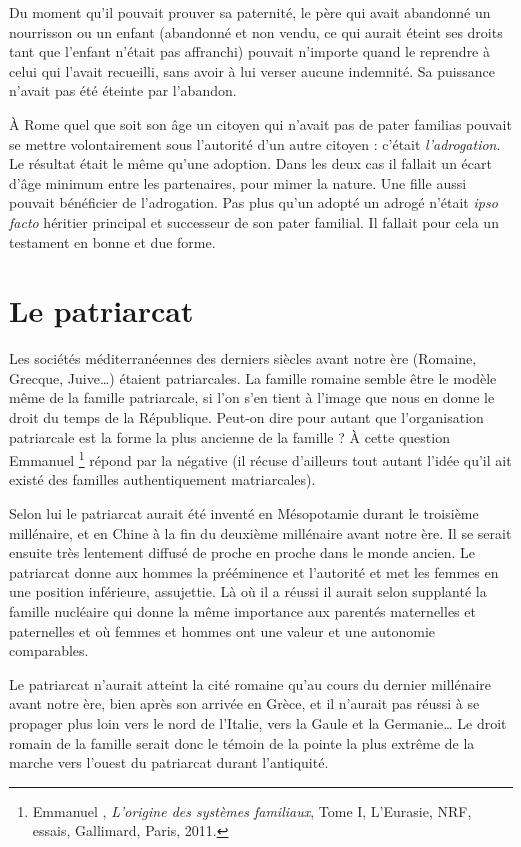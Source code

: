 Du moment qu'il pouvait prouver sa paternité, le père qui avait
abandonné un nourrisson ou un enfant (abandonné et non vendu, ce qui
aurait éteint ses droits tant que l'enfant n'était pas affranchi) pouvait
n'importe quand le reprendre à celui qui l'avait recueilli, sans avoir à lui
verser aucune indemnité. Sa puissance n'avait pas été éteinte par l'abandon.

À Rome quel que soit son âge un citoyen qui n'avait pas de pater
familias pouvait se mettre volontairement sous l'autorité d'un autre citoyen :
c'était \emph{l'adrogation}. Le résultat était le même qu'une adoption. Dans
les deux cas il fallait un écart d'âge minimum entre les partenaires, pour
mimer la nature. Une fille aussi pouvait bénéficier de l'adrogation. Pas
plus qu'un adopté un adrogé n'était \emph{ipso facto} héritier principal et successeur
de son pater familial. Il fallait pour cela un testament en bonne et
due forme.

\section{Le patriarcat}

Les sociétés méditerranéennes des derniers siècles avant notre ère
(Romaine, Grec\-que, Juive…) étaient patriarcales. La famille romaine
semble être le modèle même de la famille patriarcale, si l'on s'en tient à
l'image que nous en donne le droit du temps de la République. Peut-on
dire pour autant que l'organisation patriarcale est la forme la plus ancienne
de la famille ? À cette question Emmanuel %
\footnote{Emmanuel , \emph{L'origine des systèmes familiaux}, Tome I, L'Eurasie, NRF,
essais, Gallimard, Paris, 2011.}
répond par
la négative (il récuse d'ailleurs tout autant l'idée qu'il ait existé des familles
authentiquement matriarcales).

Selon lui le patriarcat aurait été inventé en Mésopotamie durant le
troisième millénaire, et en Chine à la fin du deuxième millénaire avant
notre ère. Il se serait ensuite très lentement diffusé de proche en proche
dans le monde ancien. Le patriarcat donne aux hommes la prééminence
et l'autorité et met les femmes en une position inférieure, assujettie. Là
où il a réussi il aurait selon  supplanté la famille nucléaire qui
donne la même importance aux parentés maternelles et paternelles et où
femmes et hommes ont une valeur et une autonomie comparables.

Le patriarcat n'aurait atteint la cité romaine qu'au cours du dernier
millénaire avant notre ère, bien après son arrivée en Grèce, et il n'aurait
pas réussi à se propager plus loin vers le nord de l'Italie, vers la Gaule et
la Germanie… Le droit romain de la famille serait donc le témoin de la
pointe la plus extrême de la marche vers l'ouest du patriarcat durant
l'antiquité.

